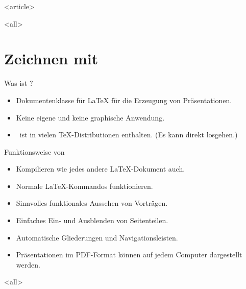 \documentclass[xcolor=table]{beamer}
\begin{document}
\mode
<article>


\dominitoc
{}
\tableofcontents

\mode
<all>

\jonny

\label{chapter-tikz}
\setcounter{part}{1}
\chapter{Zeichnen mit \TikZ}

\website







\begin{Frame}{Was ist \beamer?}
  \begin{itemize}
    \item \alert{Dokumentenklasse für \LaTeX} für die Erzeugung von Präsentationen.
    \item Keine eigene und \alert{keine graphische Anwendung}.
    \item \strut\beamer\ ist in vielen \TeX-Distributionen enthalten.\newline
      (\alert{Es kann direkt losgehen}.)
  \end{itemize}
\end{Frame}

\begin{Frame}{Funktionsweise von \beamer}
  \begin{itemize}
    \item Kompilieren wie jedes andere \LaTeX-Dokument auch.
    \item Normale \LaTeX-Kommandos funktionieren.
    \item Sinnvolles funktionales Aussehen von Vorträgen.
    \item Einfaches Ein- und Ausblenden von Seitenteilen.
    \item Automatische Gliederungen und Navigationsleisten.
    \item Präsentationen im PDF-Format können auf jedem Computer dargestellt werden.
  \end{itemize}
\end{Frame}

\mode
<all>

\website
\end{document}
